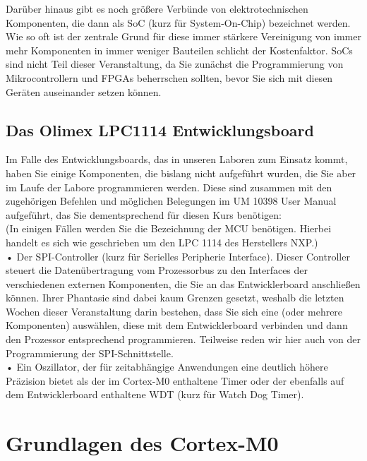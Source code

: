 Darüber hinaus gibt es noch größere Verbünde von elektrotechnischen Komponenten, die dann als SoC (kurz für System-On-Chip) bezeichnet werden. Wie so oft ist der zentrale Grund für diese immer stärkere Vereinigung von immer mehr Komponenten in immer weniger Bauteilen schlicht der Kostenfaktor. SoCs sind nicht Teil dieser Veranstaltung, da Sie zunächst die Programmierung von Mikrocontrollern und FPGAs beherrschen sollten, bevor Sie sich mit diesen Geräten auseinander setzen können.\\

\subsection{Das Olimex LPC1114 Entwicklungsboard}

Im Falle des Entwicklungsboards, das in unseren Laboren zum Einsatz kommt, haben Sie einige Komponenten, die bislang nicht aufgeführt wurden, die Sie aber im Laufe der Labore programmieren werden. Diese sind zusammen mit den zugehörigen Befehlen und möglichen Belegungen im UM 10398 User Manual aufgeführt, das Sie dementsprechend für diesen Kurs benötigen:\\

(In einigen Fällen werden Sie die Bezeichnung der MCU benötigen. Hierbei handelt es sich wie geschrieben um den LPC 1114 des Herstellers NXP.)\\

•	Der SPI-Controller (kurz für Serielles Peripherie Interface). Dieser Controller steuert die Datenübertragung vom Prozessorbus zu den Interfaces der verschiedenen externen Komponenten, die Sie an das Entwicklerboard anschließen können. Ihrer Phantasie sind dabei kaum Grenzen gesetzt, weshalb die letzten Wochen dieser Veranstaltung darin bestehen, dass Sie sich eine (oder mehrere Komponenten) auswählen, diese mit dem Entwicklerboard verbinden und dann den Prozessor entsprechend programmieren. Teilweise reden wir hier auch von der Programmierung der SPI-Schnittstelle.\\

•	Ein Oszillator, der für zeitabhängige Anwendungen eine deutlich höhere Präzision bietet als der im Cortex-M0 enthaltene Timer oder der ebenfalls auf dem Entwicklerboard enthaltene WDT (kurz für Watch Dog Timer).\\

\section{Grundlagen des Cortex-M0}

